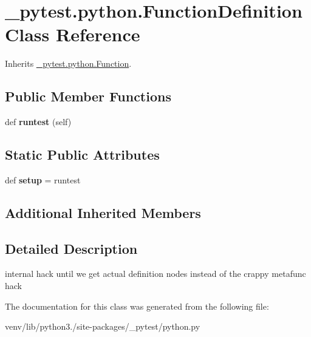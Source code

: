 \hypertarget{class__pytest_1_1python_1_1_function_definition}{}\section{\+\_\+pytest.\+python.\+Function\+Definition Class Reference}
\label{class__pytest_1_1python_1_1_function_definition}


Inherits \hyperlink{class__pytest_1_1python_1_1_function}{\+\_\+pytest.\+python.\+Function}.

\subsection*{Public Member Functions}
\begin{DoxyCompactItemize}
\item 
\mbox{\label{class__pytest_1_1python_1_1_function_definition_aea6ed6c0f3fa4694371a7c151563249c}} 
def {\bfseries runtest} (self)
\end{DoxyCompactItemize}
\subsection*{Static Public Attributes}
\begin{DoxyCompactItemize}
\item 
\mbox{\label{class__pytest_1_1python_1_1_function_definition_aa0678de3b6a7e0a813becddb94ea058d}} 
def {\bfseries setup} = runtest
\end{DoxyCompactItemize}
\subsection*{Additional Inherited Members}


\subsection{Detailed Description}
\begin{DoxyVerb}internal hack until we get actual definition nodes instead of the
crappy metafunc hack
\end{DoxyVerb}
 

The documentation for this class was generated from the following file\+:\begin{DoxyCompactItemize}
\item 
venv/lib/python3./site-\/packages/\+\_\+pytest/python.\+py\end{DoxyCompactItemize}
